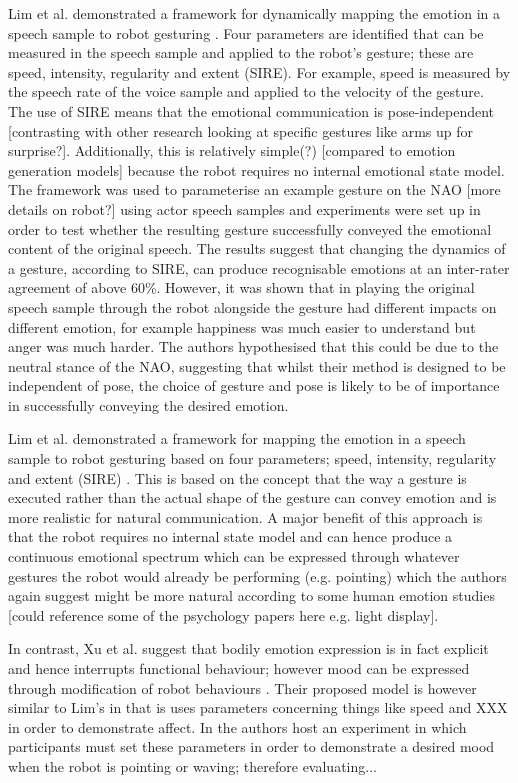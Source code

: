 \documentclass[]{article}
\begin{document}
Lim et al. demonstrated a framework for dynamically mapping the emotion in a speech sample to robot gesturing \cite{lim2011converting}. Four parameters are identified that can be measured in the speech sample and applied to the robot's gesture; these are speed, intensity, regularity and extent (SIRE). For example, speed is measured by the speech rate of the voice sample and applied to the velocity of the gesture. The use of SIRE means that the emotional communication is pose-independent [contrasting with other research looking at specific gestures like arms up for surprise?]. Additionally, this is relatively simple(?) [compared to emotion generation models] because the robot requires no internal emotional state model. The framework was used to parameterise an example gesture on the NAO [more details on robot?] using actor speech samples and experiments were set up in order to test whether the resulting gesture successfully conveyed the emotional content of the original speech. The results suggest that changing the dynamics of a gesture, according to SIRE, can produce recognisable emotions at an inter-rater agreement of above 60\%. However, it was shown that in playing the original speech sample through the robot alongside the gesture had different impacts on different emotion, for example happiness was much easier to understand but anger was much harder. The authors hypothesised that this could be due to the neutral stance of the NAO, suggesting that whilst their method is designed to be independent of pose, the choice of gesture and pose is likely to be of importance in successfully conveying the desired emotion.

Lim et al. demonstrated a framework for mapping the emotion in a speech sample to robot gesturing based on four parameters;  speed, intensity, regularity and extent (SIRE) \cite{lim2011converting}. This is based on the concept that the way a gesture is executed rather than the actual shape of the gesture can convey emotion and is more realistic for natural communication. A major benefit of this approach is that the robot requires no internal state model and can hence produce a continuous emotional spectrum which can be expressed through whatever gestures the robot would already be performing (e.g. pointing) which the authors again suggest might be more natural according to some human emotion studies [could reference some of the psychology papers here e.g. light display].

In contrast, Xu et al. suggest that bodily emotion expression is in fact explicit and hence interrupts functional behaviour; however mood can be expressed through modification of robot behaviours \cite{xu2013mood}. Their proposed model is however similar to Lim's in that is uses parameters concerning things like speed and XXX in order to demonstrate affect. In \cite{xu2013mood} the authors host an experiment in which participants must set these parameters in order to demonstrate a desired mood when the robot is pointing or waving; therefore evaluating...  
\end{document}
